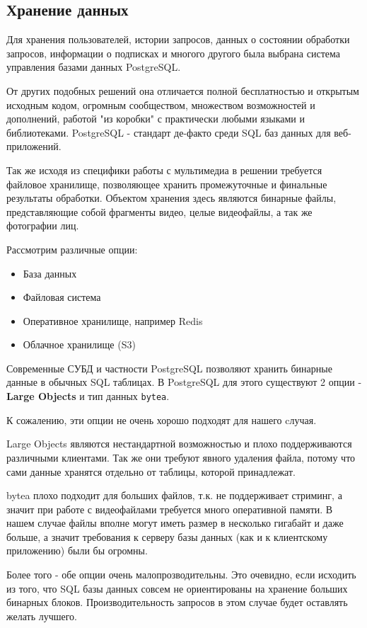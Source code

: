 \subsection{Хранение данных}

Для хранения пользователей, истории запросов, данных о состоянии обработки запросов, информации о подписках и многого другого была выбрана система управления базами данных PostgreSQL.

От других подобных решений она отличается полной бесплатностью и открытым исходным кодом, огромным сообществом, множеством возможностей и дополнений, работой "из коробки" с практически любыми языками и библиотеками. PostgreSQL - стандарт де-факто среди SQL баз данных для веб-приложений.

Так же исходя из специфики работы с мультимедиа в решении требуется файловое хранилище, позволяющее хранить промежуточные и финальные результаты обработки. Объектом хранения здесь являются бинарные файлы, представляющие собой фрагменты видео, целые видеофайлы, а так же фотографии лиц.

Рассмотрим различные опции:

\begin{itemize}
	\item База данных
	\item Файловая система
	\item Оперативное хранилище, например Redis
	\item Облачное хранилище (S3)
\end{itemize}

Современные СУБД и частности PostgreSQL позволяют хранить бинарные данные в обычных SQL таблицах. В PostgreSQL для этого существуют 2 опции - \textbf{Large Objects} и тип данных \texttt{bytea}.

К сожалению, эти опции не очень хорошо подходят для нашего cлучая.

Large Objects являются нестандартной возможностью и плохо поддерживаются различными клиентами. Так же они требуют явного удаления файла, потому что сами данные хранятся отдельно от таблицы, которой принадлежат.

bytea плохо подходит для больших файлов, т.к. не поддерживает стриминг, а значит при работе с видеофайлами требуется много оперативной памяти. В нашем случае файлы вполне могут иметь размер в несколько гигабайт и даже больше, а значит требования к серверу базы данных (как и к клиентскому приложению) были бы огромны.

Более того - обе опции очень малопрозводительны. Это очевидно, если исходить из того, что SQL базы данных совсем не ориентированы на хранение больших бинарных блоков. Производительность запросов в этом случае будет оставлять желать лучшего.

